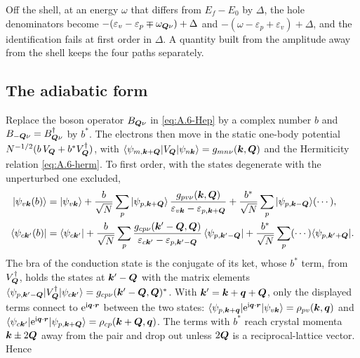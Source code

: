 Off the shell, at an energy $\omega$ that differs from $E_f - E_0$ by $\Delta$, the hole denominators become $-(\varepsilon_v - \varepsilon_p \mp \omega_{\bm{Q}\nu}) + \Delta$ and $-(\omega - \varepsilon_p + \varepsilon_v) + \Delta$, and the identification fails at first order in $\Delta$. A quantity built from the amplitude away from the shell keeps the four paths separately.

\subsection*{The adiabatic form}

Replace the boson operator $B_{\bm{Q}\nu}$ in \cref{eq:A.6-Hep} by a complex number $b$ and $B_{-\bm{Q}\nu} = B^\dagger_{\bm{Q}\nu}$ by $b^*$. The electrons then move in the static one-body potential $N^{-1/2}(b\,V_{\bm{Q}} + b^*V^\dagger_{\bm{Q}})$, with $\langle\psi_{m,\bm{k}+\bm{Q}}|V_{\bm{Q}}|\psi_{n\bm{k}}\rangle = g_{mn\nu}(\bm{k},\bm{Q})$ and the Hermiticity relation \cref{eq:A.6-herm}. To first order, with the states degenerate with the unperturbed one excluded,
\begin{equation*}
  \begin{aligned}
  |\psi_{v\bm{k}}(b)\rangle &= |\psi_{v\bm{k}}\rangle + \frac{b}{\sqrt N}\sum_p|\psi_{p,\bm{k}+\bm{Q}}\rangle\,\frac{g_{pv\nu}(\bm{k},\bm{Q})}{\varepsilon_{v\bm{k}} - \varepsilon_{p,\bm{k}+\bm{Q}}} + \frac{b^*}{\sqrt N}\sum_p|\psi_{p,\bm{k}-\bm{Q}}\rangle(\cdots) , \\
  \langle\psi_{c\bm{k}'}(b)| &= \langle\psi_{c\bm{k}'}| + \frac{b}{\sqrt N}\sum_p\frac{g_{cp\nu}(\bm{k}'-\bm{Q},\bm{Q})}{\varepsilon_{c\bm{k}'} - \varepsilon_{p,\bm{k}'-\bm{Q}}}\,\langle\psi_{p,\bm{k}'-\bm{Q}}| + \frac{b^*}{\sqrt N}\sum_p(\cdots)\langle\psi_{p,\bm{k}'+\bm{Q}}| .
  \end{aligned}
\end{equation*}
The bra of the conduction state is the conjugate of its ket, whose $b^*$ term, from $V^\dagger_{\bm{Q}}$, holds the states at $\bm{k}'-\bm{Q}$ with the matrix elements $\langle\psi_{p,\bm{k}'-\bm{Q}}|V^\dagger_{\bm{Q}}|\psi_{c\bm{k}'}\rangle = g_{cp\nu}(\bm{k}'-\bm{Q},\bm{Q})^*$. With $\bm{k}' = \bm{k}+\bm{q}+\bm{Q}$, only the displayed terms connect to $\mathrm{e}^{\mathrm{i}\bm{q}\cdot\bm{r}}$ between the two states: $\langle\psi_{p,\bm{k}+\bm{q}}|\mathrm{e}^{\mathrm{i}\bm{q}\cdot\bm{r}}|\psi_{v\bm{k}}\rangle = \rho_{pv}(\bm{k},\bm{q})$ and $\langle\psi_{c\bm{k}'}|\mathrm{e}^{\mathrm{i}\bm{q}\cdot\bm{r}}|\psi_{p,\bm{k}+\bm{Q}}\rangle = \rho_{cp}(\bm{k}+\bm{Q},\bm{q})$. The terms with $b^*$ reach crystal momenta $\bm{k}\pm2\bm{Q}$ away from the pair and drop out unless $2\bm{Q}$ is a reciprocal-lattice vector. Hence
